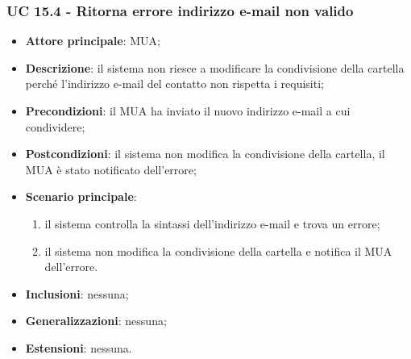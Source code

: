     \subsubsection{UC 15.4 - Ritorna errore indirizzo e-mail non valido} \label{sec:UC15.4}
    \begin{itemize}
        \item \textbf{Attore principale}: MUA;
        \item \textbf{Descrizione}: il sistema non riesce a modificare la condivisione della cartella perché l'indirizzo e-mail del contatto non rispetta i requisiti;
        \item \textbf{Precondizioni}: il MUA ha inviato il nuovo indirizzo e-mail a cui condividere;
        \item \textbf{Postcondizioni}: il sistema non modifica la condivisione della cartella, il MUA è stato notificato dell'errore;
        \item \textbf{Scenario principale}:
            \begin{enumerate}
                \item il sistema controlla la sintassi dell'indirizzo e-mail e trova un errore;
                \item il sistema non modifica la condivisione della cartella e notifica il MUA dell'errore.
            \end{enumerate}
        \item \textbf{Inclusioni}: nessuna;
        \item \textbf{Generalizzazioni}: nessuna;
        \item \textbf{Estensioni}: nessuna.
    \end{itemize}
